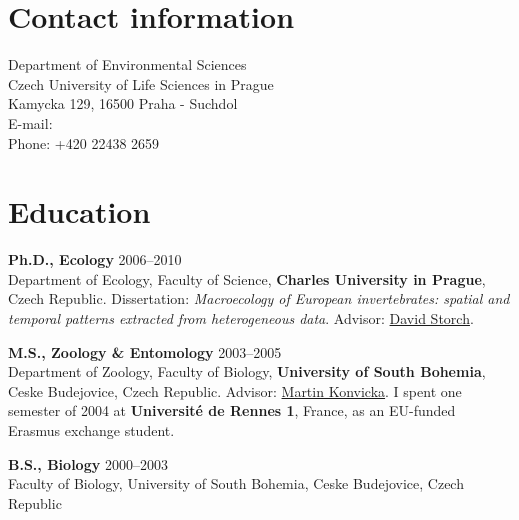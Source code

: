 
\usepackage{wasysym}





\thispagestyle{empty}

\section{Contact information}

	Department of Environmental Sciences \\
	Czech University of Life Sciences in Prague \\
	Kamycka 129, 16500 Praha - Suchdol\\
    E-mail: \\
    Phone: +420 22438 2659

   
\HRule

\section{Education}

\begin{innerlist}

\item[]{\bf  Ph.D., Ecology} 
\hfill {2006--2010} \\
Department of Ecology, Faculty of Science, {\bf Charles University in Prague}, Czech Republic. Dissertation: \textit{Macroecology of European invertebrates: spatial and temporal patterns extracted from heterogeneous data}. Advisor: \href{http://www.cts.cuni.cz/~storch/}{David Storch}.\\

\item[]{\bf  M.S., Zoology \& Entomology} 
\hfill {2003--2005} \\
Department of Zoology, Faculty of Biology, {\bf University of South Bohemia}, Ceske Budejovice, Czech Republic. Advisor: \href{http://www.entu.cas.cz/en/staff/Martin-Konvicka-r81r/?all_publications=show}{Martin Konvicka}. I spent one semester of 2004 at {\bf Universit\'{e} de Rennes 1}, France, as an EU-funded Erasmus exchange student.\\ 

\item[]{\bf  B.S., {Biology}} 
\hfill {2000--2003} \\
Faculty of Biology, University of South Bohemia, Ceske Budejovice, Czech Republic\\

\end{innerlist}

